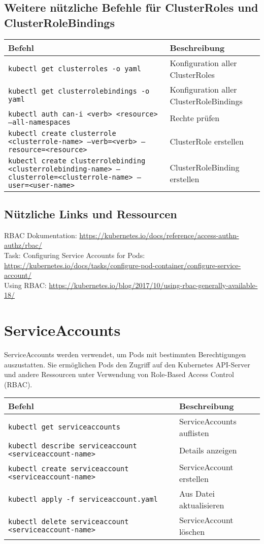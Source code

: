 \subsection{Weitere nützliche Befehle für ClusterRoles und ClusterRoleBindings}
\begin{tabular}{
|p{}|p{}|}
\hline
\textbf{Befehl} & \textbf{Beschreibung} \\
\hline
\texttt{kubectl get clusterroles -o yaml} & Konfiguration aller ClusterRoles \\
\texttt{kubectl get clusterrolebindings -o yaml} & Konfiguration aller ClusterRoleBindings \\
\texttt{kubectl auth can-i <verb> <resource> --all-namespaces} & Rechte prüfen \\
\texttt{kubectl create clusterrole <clusterrole-name> --verb=<verb> --resource=<resource>} & ClusterRole erstellen \\
\texttt{kubectl create clusterrolebinding <clusterrolebinding-name> --clusterrole=<clusterrole-name> --user=<user-name>} & ClusterRoleBinding erstellen \\
\hline
\end{tabular}

\subsection*{Nützliche Links und Ressourcen}
RBAC Dokumentation: \url{https://kubernetes.io/docs/reference/access-authn-authz/rbac/}\\
Task: Configuring Service Accounts for Pods:\\
\url{https://kubernetes.io/docs/tasks/configure-pod-container/configure-service-account/}\\
Using RBAC: \url{https://kubernetes.io/blog/2017/10/using-rbac-generally-available-18/}\\


\section{ServiceAccounts}
ServiceAccounts werden verwendet, um Pods mit bestimmten Berechtigungen auszustatten. Sie ermöglichen Pods den Zugriff auf den Kubernetes API-Server und andere Ressourcen unter Verwendung von Role-Based Access Control (RBAC).\\

\noindent
\begin{tabular}{
|p{}|p{}|}
\hline
\textbf{Befehl} & \textbf{Beschreibung} \\
\hline
\texttt{kubectl get serviceaccounts} & ServiceAccounts auflisten \\
\texttt{kubectl describe serviceaccount <serviceaccount-name>} & Details anzeigen \\
\texttt{kubectl create serviceaccount <serviceaccount-name>} & ServiceAccount erstellen \\
\texttt{kubectl apply -f serviceaccount.yaml} & Aus Datei aktualisieren\\
\texttt{kubectl delete serviceaccount <serviceaccount-name>} & ServiceAccount löschen \\
\hline
\end{tabular}


